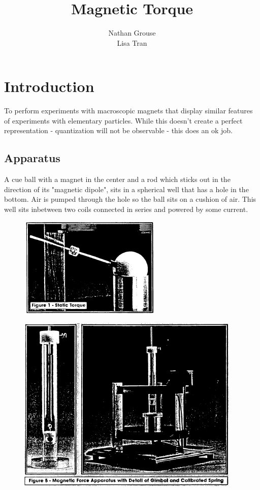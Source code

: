\documentclass[12pt]{article}
\title{Magnetic Torque}
\author{Nathan Grouse\\Lisa Tran}
\begin{document}
\maketitle

\section{Introduction}
\indent \indent To perform experiments with macroscopic magnets that display similar features of experiments with elementary particles. While this doesn't create a perfect representation - quantization will not be observable - this does an ok job.

\subsection{Apparatus}
\indent \indent A cue ball with a magnet in the center and a rod which sticks out in the direction of its "magnetic dipole", sits in a spherical well that has a hole in the bottom. Air is pumped through the hole so the ball sits on a cushion of air. This well sits inbetween two coils connected in series and powered by some current.

\begin{figure}[H]
\centering
\hspace{-0.0in}\includegraphics[scale=0.90]{apparatus.png}
\end{figure}

\begin{figure}[H]
\centering
\hspace{-0.0in}\includegraphics[scale=0.60]{apparatus2.png}
\end{figure}
\end{document}
